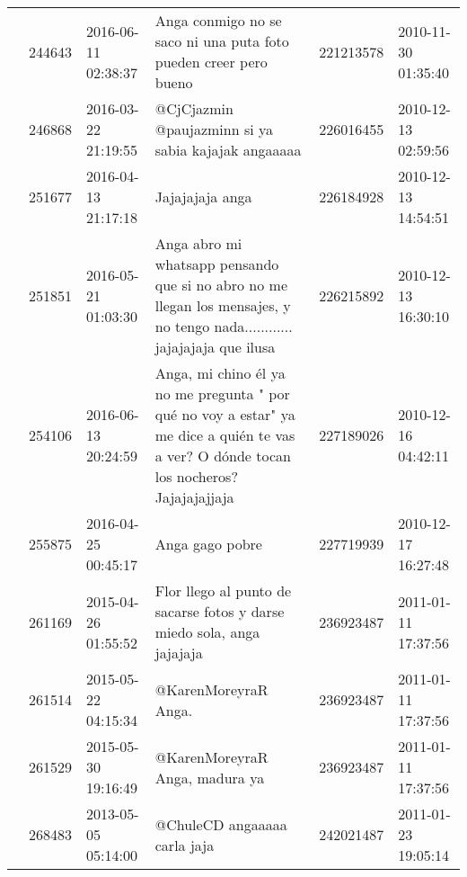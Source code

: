 \begin{tabular}{llllrl}
           & 244643  & 2016-06-11 02:38:37 &                                                                             Anga conmigo no se saco ni una puta foto pueden creer pero bueno &   221213578 & 2010-11-30 01:35:40 \\
           & 246868  & 2016-03-22 21:19:55 &                                                                                          @CjCjazmin @paujazminn si ya sabia kajajak angaaaaa &   226016455 & 2010-12-13 02:59:56 \\
           & 251677  & 2016-04-13 21:17:18 &                                                                                                                              Jajajajaja anga &   226184928 & 2010-12-13 14:54:51 \\
           & 251851  & 2016-05-21 01:03:30 &                    Anga abro mi whatsapp pensando que si no abro no me llegan los mensajes, y no tengo nada............ jajajajaja que ilusa &   226215892 & 2010-12-13 16:30:10 \\
           & 254106  & 2016-06-13 20:24:59 &     Anga, mi chino él ya no me pregunta " por qué no voy a estar" ya me dice a quién te vas a ver? O dónde tocan los nocheros? Jajajajajjaja &   227189026 & 2010-12-16 04:42:11 \\
           & 255875  & 2016-04-25 00:45:17 &                                                                                                                              Anga gago pobre &   227719939 & 2010-12-17 16:27:48 \\
           & 261169  & 2015-04-26 01:55:52 &                                                                       Flor llego al punto de sacarse fotos y darse miedo sola, anga jajajaja &   236923487 & 2011-01-11 17:37:56 \\
           & 261514  & 2015-05-22 04:15:34 &                                                                                                                         @KarenMoreyraR Anga. &   236923487 & 2011-01-11 17:37:56 \\
           & 261529  & 2015-05-30 19:16:49 &                                                                                                               @KarenMoreyraR Anga, madura ya &   236923487 & 2011-01-11 17:37:56 \\
           & 268483  & 2013-05-05 05:14:00 &                                                                                                                 @ChuleCD angaaaaa carla jaja &   242021487 & 2011-01-23 19:05:14 \\

\end{tabular}
